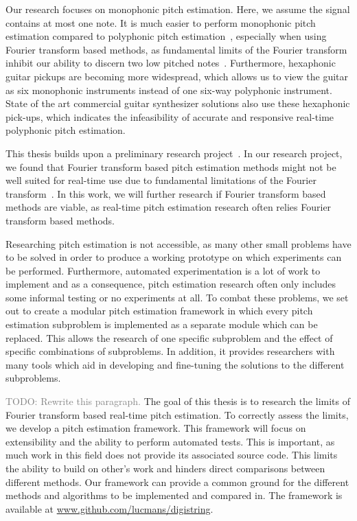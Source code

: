 \documentclass[10pt,twocolumn]{article}
\begin{document}
Our research focuses on monophonic pitch estimation. Here, we assume the signal contains at most one note. It is much easier to perform monophonic pitch estimation compared to polyphonic pitch estimation~\cite{monotopoly}, especially when using Fourier transform based methods, as fundamental limits of the Fourier transform inhibit our ability to discern two low pitched notes~\cite{nopoly}. Furthermore, hexaphonic guitar pickups are becoming more widespread, which allows us to view the guitar as six monophonic instruments instead of one six-way polyphonic instrument. State of the art commercial guitar synthesizer solutions also use these hexaphonic pick-ups, which indicates the infeasibility of accurate and responsive real-time polyphonic pitch estimation.

This thesis builds upon a preliminary research project~\cite{ik}. In our research project, we found that Fourier transform based pitch estimation methods might not be well suited for real-time use due to fundamental limitations of the Fourier transform~\cite{fourierlimit}. In this work, we will further research if Fourier transform based methods are viable, as real-time pitch estimation research often relies Fourier transform based methods.

Researching pitch estimation is not accessible, as many other small problems have to be solved in order to produce a working prototype on which experiments can be performed. Furthermore, automated experimentation is a lot of work to implement and as a consequence, pitch estimation research often only includes some informal testing or no experiments at all. To combat these problems, we set out to create a modular pitch estimation framework in which every pitch estimation subproblem is implemented as a separate module which can be replaced. This allows the research of one specific subproblem and the effect of specific combinations of subproblems. In addition, it provides researchers with many tools which aid in developing and fine-tuning the solutions to the different subproblems.

\textcolor{gray}{TODO: Rewrite this paragraph.} The goal of this thesis is to research the limits of Fourier transform based real-time pitch estimation. To correctly assess the limits, we develop a pitch estimation framework. This framework will focus on extensibility and the ability to perform automated tests. This is important, as much work in this field does not provide its associated source code. This limits the ability to build on other's work and hinders direct comparisons between different methods. Our framework can provide a common ground for the different methods and algorithms to be implemented and compared in. The framework is available at \url{www.github.com/lucmans/digistring}.
\end{document}
